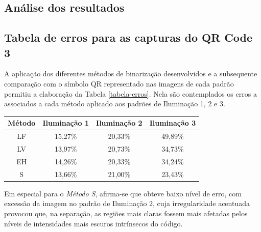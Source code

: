 \documentclass{ceel}
\begin{document}
\begin{multicols}{2}
\begin{minipage}[h]{\columnwidth}
\vspace{-0.1cm}
\caption{Imagens resultantes da Binarização Pós Equalização por Histograma para o QR Code 3 nos padrões de (a) Iluminação 1, (c) Iluminação 2 e (e) Iluminação 3, com suas respectivas imagens diferença em (b), (d) e (f).} \label{figEH}
\end{minipage}


\section{Análise dos resultados} \label{resultados}

\subsection{Tabela de erros para as capturas do QR Code 3}
A aplicação dos diferentes métodos de binarização desenvolvidos e a subsequente comparação com o símbolo QR representado nas imagens de cada padrão permitiu a elaboração da Tabela \ref{tabela-erros}. Nela são contemplados os erros a associados a cada método aplicado aos padrões de Iluminação 1, 2 e 3. 

\vspace{0.2cm}
\begin{minipage}[h]{\columnwidth}
\begin{scriptsize}
\def\arraystretch{1.35}
    \captionsetup{type=table}
    \begin{center}
    \caption{Erros associados às capturas de imagem do QR Code 3} \label{tabela-erros} \vspace{-0.2cm}
    \begin{tabular}{ c  c  c  c } \toprule
    \textbf{Método}&  \textbf{Iluminação 1}& \textbf{Iluminação 2}& \textbf{Iluminação 3}\\\midrule
     LF & 15,27\% & 20,33\% & 49,89\%\\
     LV & 13,97\% & 20,73\% & 34,73\%\\
     EH & 14,26\% & 20,33\% & 34,24\%\\
     S   & 13,66\% & 21,00\% & 23,43\%\\\bottomrule
    \end{tabular}
   \end{center}
\end{scriptsize}
\end{minipage}
\vspace{0.2cm}

Em especial para o \emph{Método S}, afirma-se que obteve baixo nível de erro, com excessão da imagem no padrão de Iluminação 2, cuja irregularidade acentuada provocou que, na separação, as regiões mais claras fossem mais afetadas pelos níveis de intensidades mais escuros intrínsecos do código.


\end{multicols}
\end{document}
